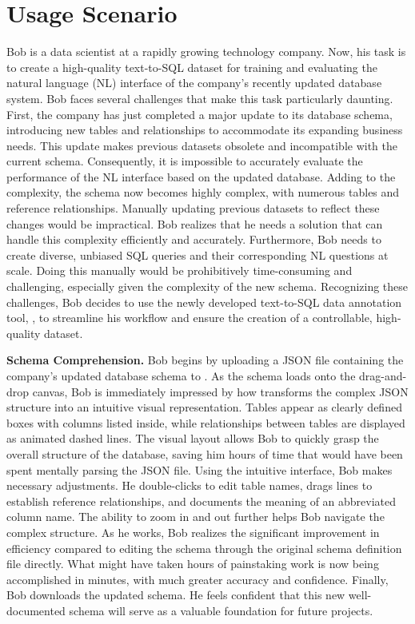 \section{Usage Scenario}

Bob is a data scientist at a rapidly growing technology company. 
Now, his task is to create a high-quality text-to-SQL dataset for training and evaluating the natural language (NL) interface of the company's recently updated database system.
Bob faces several challenges that make this task particularly daunting.
First, the company has just completed a major update to its database schema, introducing new tables and relationships to accommodate its expanding business needs. 
This update makes previous datasets obsolete and incompatible with the current schema. 
Consequently, it is impossible to accurately evaluate the performance of the NL interface based on the updated database.
Adding to the complexity, the schema now becomes highly complex, with numerous tables and reference relationships. Manually updating previous datasets to reflect these changes would be impractical. Bob realizes that he needs a solution that can handle this complexity efficiently and accurately.
Furthermore, Bob needs to create diverse, unbiased SQL queries and their corresponding NL questions at scale. Doing this manually would be prohibitively time-consuming and challenging, especially given the complexity of the new schema.
Recognizing these challenges, Bob decides to use the newly developed text-to-SQL data annotation tool, {\tool}, to streamline his workflow and ensure the creation of a controllable, high-quality dataset.


\textbf{Schema Comprehension.}
Bob begins by uploading a JSON file containing the company's updated database schema to {\tool}. As the schema loads onto the drag-and-drop canvas, Bob is immediately impressed by how {\tool} transforms the complex JSON structure into an intuitive visual representation. Tables appear as clearly defined boxes with columns listed inside, while relationships between tables are displayed as animated dashed lines.
The visual layout allows Bob to quickly grasp the overall structure of the database, saving him hours of time that would have been spent mentally parsing the JSON file.
Using the intuitive interface, Bob makes necessary adjustments. He double-clicks to edit table names, drags lines to establish reference relationships, and documents the meaning of an abbreviated column name. The ability to zoom in and out further helps Bob navigate the complex structure. 
As he works, Bob realizes the significant improvement in efficiency compared to editing the schema through the original schema definition file directly. What might have taken hours of painstaking work is now being accomplished in minutes, with much greater accuracy and confidence. Finally, Bob downloads the updated schema. He feels confident that this new well-documented schema will serve as a valuable foundation for future projects.

